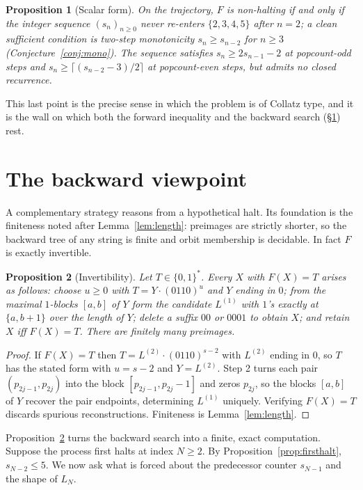 \documentclass[11pt,reqno]{amsart}
\theoremstyle{plain}
\newtheorem{proposition}{Proposition}
\theoremstyle{definition}
\theoremstyle{remark}
\begin{document}
\begin{proposition}[Scalar form]\label{prop:scalar}
On the trajectory, $F$ is non-halting if and only if the integer sequence $(s_n)_{n\ge 0}$ never re-enters $\{2,3,4,5\}$ after $n=2$; a clean sufficient condition is two-step monotonicity $s_n\ge s_{n-2}$ for $n\ge 3$ (Conjecture~\ref{conj:mono}). The sequence satisfies $s_n\ge 2s_{n-1}-2$ at popcount-odd steps and $s_n\ge\lceil(s_{n-2}-3)/2\rceil$ at popcount-even steps, but admits no closed recurrence.
\end{proposition}

This last point is the precise sense in which the problem is of Collatz type, and it is the wall on which both the forward inequality and the backward search (\S\ref{sec:backward}) rest.

\section{The backward viewpoint}\label{sec:backward}
A complementary strategy reasons from a hypothetical halt. Its foundation is the finiteness noted after Lemma~\ref{lem:length}: preimages are strictly shorter, so the backward tree of any string is finite and orbit membership is decidable. In fact $F$ is exactly invertible.

\begin{proposition}[Invertibility]\label{prop:inv}
Let $T\in\{0,1\}^*$. Every $X$ with $F(X)=T$ arises as follows: choose $u\ge 0$ with $T=Y\cdot(0110)^u$ and $Y$ ending in $0$; from the maximal $1$-blocks $[a,b]$ of $Y$ form the candidate $L^{(1)}$ with $1$'s exactly at $\{a,b+1\}$ over the length of $Y$; delete a suffix $00$ or $0001$ to obtain $X$; and retain $X$ iff $F(X)=T$. There are finitely many preimages.
\end{proposition}
\begin{proof}
If $F(X)=T$ then $T=L^{(2)}\cdot(0110)^{s-2}$ with $L^{(2)}$ ending in $0$, so $T$ has the stated form with $u=s-2$ and $Y=L^{(2)}$. Step 2 turns each pair $(p_{2j-1},p_{2j})$ into the block $[p_{2j-1},p_{2j}-1]$ and zeros $p_{2j}$, so the blocks $[a,b]$ of $Y$ recover the pair endpoints, determining $L^{(1)}$ uniquely. Verifying $F(X)=T$ discards spurious reconstructions. Finiteness is Lemma~\ref{lem:length}.
\end{proof}

Proposition~\ref{prop:inv} turns the backward search into a finite, exact computation. Suppose the process first halts at index $N\ge 2$. By Proposition~\ref{prop:firsthalt}, $s_{N-2}\le 5$. We now ask what is forced about the predecessor counter $s_{N-1}$ and the shape of $L_N$.
\end{document}
